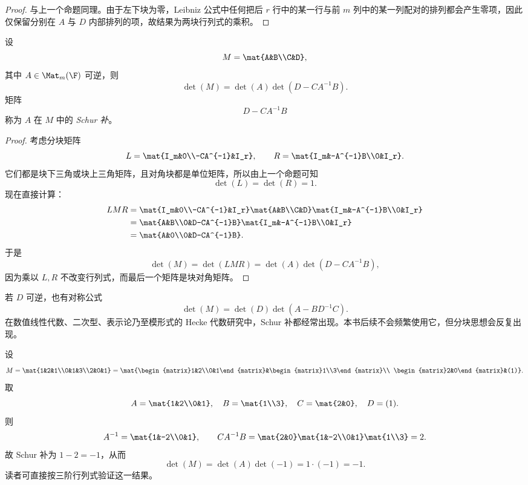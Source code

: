\begin{proof}
与上一个命题同理。由于左下块为零，Leibniz 公式中任何把后 $r$ 行中的某一行与前 $m$ 列中的某一列配对的排列都会产生零项，因此仅保留分别在 $A$ 与 $D$ 内部排列的项，故结果为两块行列式的乘积。
\end{proof}

\begin{theorem}
设
\[
M=\mat{A&B\\C&D},
\]
其中 $A\in\Mat_m(\F)$ 可逆，则
\[
\det(M)=\det(A)\det(D-CA^{-1}B).
\]
矩阵
\[
D-CA^{-1}B
\]
称为 $A$ 在 $M$ 中的 \emph{Schur 补}。
\end{theorem}

\begin{proof}
考虑分块矩阵
\[
L=\mat{I_m&0\\-CA^{-1}&I_r},
\qquad
R=\mat{I_m&-A^{-1}B\\0&I_r}.
\]
它们都是块下三角或块上三角矩阵，且对角块都是单位矩阵，所以由上一个命题可知
\[
\det(L)=\det(R)=1.
\]
现在直接计算：
\begin{align*}
LMR
&=
\mat{I_m&0\\-CA^{-1}&I_r}
\mat{A&B\\C&D}
\mat{I_m&-A^{-1}B\\0&I_r}\\
&=
\mat{A&B\\0&D-CA^{-1}B}
\mat{I_m&-A^{-1}B\\0&I_r}\\
&=
\mat{A&0\\0&D-CA^{-1}B}.
\end{align*}
于是
\[
\det(M)=\det(LMR)=\det(A)\det(D-CA^{-1}B),
\]
因为乘以 $L,R$ 不改变行列式，而最后一个矩阵是块对角矩阵。
\end{proof}

\begin{remark}
若 $D$ 可逆，也有对称公式
\[
\det(M)=\det(D)\det(A-BD^{-1}C).
\]
在数值线性代数、二次型、表示论乃至模形式的 Hecke 代数研究中，Schur 补都经常出现。本书后续不会频繁使用它，但分块思想会反复出现。
\end{remark}

\begin{example}
设
\[
M=\mat{1&2&1\\0&1&3\\2&0&1}
=
\mat{\begin{matrix}1&2\\0&1\end{matrix}&\begin{matrix}1\\3\end{matrix}\\
\begin{matrix}2&0\end{matrix}&(1)}.
\]
取
\[
A=\mat{1&2\\0&1},\quad B=\mat{1\\3},\quad C=\mat{2&0},\quad D=(1).
\]
则
\[
A^{-1}=\mat{1&-2\\0&1},
\qquad
CA^{-1}B=\mat{2&0}\mat{1&-2\\0&1}\mat{1\\3}=2.
\]
故 Schur 补为 $1-2=-1$，从而
\[
\det(M)=\det(A)\det(-1)=1\cdot(-1)=-1.
\]
读者可直接按三阶行列式验证这一结果。
\end{example}

